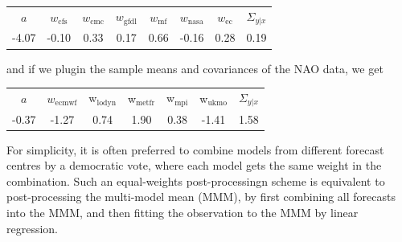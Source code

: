 \documentclass[12pt]{article}
\begin{document}
\begin{center}
\begin{tabular}{c|cccccc|c}
     $a$  &$w_{\mathrm{cfs}}$  &$w_{\mathrm{cmc}}$ &$w_{\mathrm{gfdl}}$   &$w_{\mathrm{mf}}$ &$w_{\mathrm{nasa}}$   &$w_{\mathrm{ec}}$      &$\Sigma_{y|x}$ \\
 -4.07  &-0.10   &0.33   &0.17   &0.66  &-0.16   &0.28   &0.19 
\end{tabular}
\end{center}

and if we plugin the sample means and covariances of the NAO data, we get

\begin{center}
\begin{tabular}{c|ccccc|c}
       $a$  &$w_{\mathrm{ecmwf}}$  &w$_{\mathrm{lodyn}}$  &w$_{\mathrm{metfr}}$    &w$_{\mathrm{mpi}}$   &w$_{\mathrm{ukmo}}$        &$\Sigma_{y|x}$ \\
-0.37 & -1.27  & 0.74  & 1.90  & 0.38 & -1.41  & 1.58
\end{tabular}
\end{center}


For simplicity, it is often preferred to combine models from different forecast centres by a democratic vote, where each model gets the same weight in the combination.
Such an equal-weights post-processingn scheme is equivalent to post-processing the multi-model mean (MMM), by first combining all forecasts into the MMM, and then fitting the observation to the MMM by linear regression.
\end{document}
